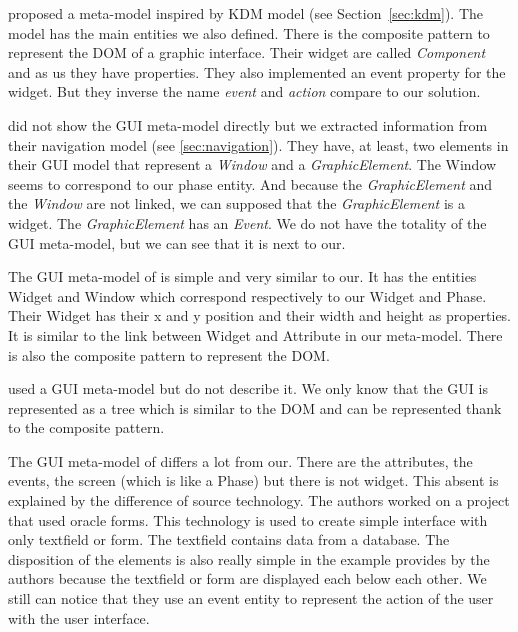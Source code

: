 \documentclass[conference]{IEEEtran}
\begin{document}
\citet{gotti2016java} proposed a meta-model inspired by KDM model (see Section~\ref{sec:kdm}).
The model has the main entities we also defined.
There is the composite pattern to represent the DOM of a graphic interface.
Their widget are called \textit{Component} and as us they have properties.
They also implemented an event property for the widget. 
But they inverse the name \textit{event} and \textit{action} compare to our solution.

\citet{fleurey2007model} did not show the GUI meta-model directly but
    we extracted information from their navigation model (see \ref{sec:navigation}).
They have, at least, two elements in their GUI model that represent a \textit{Window}
    and a \textit{GraphicElement}.
The Window seems to correspond to our phase entity.
And because the \textit{GraphicElement} and the \textit{Window} are not linked,
    we can supposed that the \textit{GraphicElement} is a widget.
The \textit{GraphicElement} has an \textit{Event}.
We do not have the totality of the GUI meta-model,
    but we can see that it is next to our.

The GUI meta-model of \citet{sanchez2014model} is simple 
    and very similar to our.
It has the entities Widget and Window which correspond respectively to
    our Widget and Phase.
Their Widget has their x and y position and their width and height as properties.
It is similar to the link between Widget and Attribute in our meta-model.
There is also the composite pattern to represent the DOM.

\citet{morgado2011reverse} used a GUI meta-model but do not describe it.
We only know that the GUI is represented as a tree which is similar to
    the DOM and can be represented thank to the composite pattern.

The GUI meta-model of \citet{garces2017white} differs a lot from our.
There are the attributes, the events, the screen (which is like a Phase)
    but there is not widget.
This absent is explained by the difference of source technology.
The authors worked on a project that used oracle forms.
This technology is used to create simple interface with only
    textfield or form.
The textfield contains data from a database.
The disposition of the elements is also really simple in the example provides
    by the authors because the textfield or form are displayed each below each other.
We still can notice that they use an event entity to represent the action of the user with the
    user interface.
\end{document}
